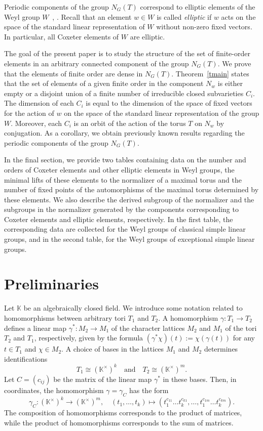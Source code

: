 \documentclass[a4paper,12pt]{amsart}
\theoremstyle{plain}
\theoremstyle{definition}
\newcommand{\KK}{\mathbb{K}}
\begin{document}
Periodic components of the group $N_G(T)$ correspond to elliptic elements of the Weyl group $W$~\cite[Proposition~5]{Fe}, \cite[Theorem~4.3]{AZ}. Recall that an element $w\in W$ is called \emph{elliptic} if $w$ acts on the space of the standard linear representation of $W$ without non-zero fixed vectors. In particular, all Coxeter elements of $W$ are elliptic.

The goal of the present paper is to study the structure of the set of finite-order elements in an arbitrary connected component of the group $N_G(T)$. We prove that the elements of finite order are dense in $N_G(T)$. Theorem~\ref{tmain} states that the set of elements of a given finite order in the component $N_w$ is either empty or a disjoint union of a finite number of irreducible closed subvarieties $C_i$. The dimension of each $C_i$ is equal to the dimension of the space of fixed vectors for the action of $w$ on the space of the standard linear representation of the group $W$. Moreover, each $C_i$ is an orbit of the action of the torus $T$ on $N_w$ by conjugation. As a corollary, we obtain previously known results regarding the periodic components of the group $N_G(T)$.

In the final section, we provide two tables containing data on the number and orders of Coxeter elements and other elliptic elements in Weyl groups, the minimal lifts of these elements to the normalizer of a maximal torus and the number of fixed points of the automorphisms of the maximal torus determined by these elements. We also describe the derived subgroup of the normalizer and the subgroups in the normalizer generated by the components corresponding to Coxeter elements and elliptic elements, respectively. In the first table, the corresponding data are collected for the Weyl groups of classical simple linear groups, and in the second table, for the Weyl groups of exceptional simple linear groups.


\section{Preliminaries}

Let $\KK$ be an algebraically closed field. We introduce some notation related to homomorphisms between arbitrary tori $T_1$ and $T_2$. A homomorphism $\gamma\colon T_1\to T_2$ defines a linear map $\gamma^*\colon M_2\to M_1$ of the character lattices $M_2$ and $M_1$ of the tori $T_2$ and $T_1$, respectively, given by the formula $(\gamma^*\chi)(t):=\chi(\gamma(t))$ for any $t\in T_1$ and $\chi\in M_2$. A choice of bases in the lattices $M_1$ and $M_2$ determines identifications
$$
T_1\cong (\KK^{\times})^k \quad \text{and}  \quad T_2\cong (\KK^{\times})^m.
$$
Let $C=(c_{ij})$ be the matrix of the linear map $\gamma^*$ in these bases. Then, in coordinates, the homomorphism $\gamma=\gamma_C$ has the form
$$
\gamma_C\colon (\KK^{\times})^k\to(\KK^{\times})^m, \quad (t_1,\ldots,t_k)\mapsto (t_1^{c_{11}}\ldots t_k^{c_{k1}},\ldots,t_1^{c_{1m}}\ldots t_k^{c_{km}}).
$$
The composition of homomorphisms corresponds to the product of matrices, while the product of homomorphisms corresponds to the sum of matrices.
\end{document}
